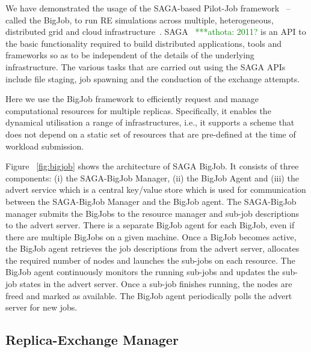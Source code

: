 \documentclass{rspublic}
\newcommand{\jhanote}[1]{ {\textcolor{red} { ***shantenu: #1 }}}
\newcommand{\athotanote}[1]{ {\textcolor{green} { ***athota: #1 }}}
\newcommand{\athotanote}[1]{}
\newcommand{\jhanote}[1]{}
\begin{document}
We have demonstrated the usage of the SAGA-based Pilot-Job
framework~\citep{saga_bigjob_condor_cloud} -- called the BigJob, to
run RE simulations across multiple, heterogeneous, distributed grid
and cloud infrastructure~\citep{Luckow:2008fp}.  SAGA~\citep{saga-url} \athotanote{2011?}
is an API to the basic functionality required to build distributed
applications, tools and frameworks so as to be independent of the
details of the underlying infrastructure.  The various tasks that are
carried out using the SAGA APIs include file staging, job spawning and
the conduction of the exchange attempts.

Here we use the BigJob framework to efficiently request and manage
computational resources for multiple replicas.  Specifically, it
enables the dynamical utilisation a range of infrastructures, i.e., it
supports a scheme that does not depend on a static set of resources
that are pre-defined at the time of workload submission.

Figure ~\ref{fig:bigjob} shows the architecture of SAGA BigJob.  It
consists of three components: (i) the SAGA-BigJob Manager, (ii) the
BigJob Agent and (iii) the advert service which is a central key/value
store which is used for communication between the SAGA-BigJob Manager
and the BigJob agent.  The SAGA-BigJob manager submits the BigJobs to
the resource manager and sub-job descriptions to the advert server.
There is a separate BigJob agent for each BigJob, even if there are
multiple BigJobs on a given machine.  Once a BigJob becomes active,
the BigJob agent retrieves the job descriptions from the advert
server, allocates the required number of nodes and launches the
sub-jobs on each resource. The BigJob agent continuously monitors the
running sub-jobs and updates the sub-job states in the advert
server. Once a sub-job finishes running, the nodes are freed and
marked as available. The BigJob agent periodically polls the advert
server for new jobs.

\subsection{Replica-Exchange Manager}\label{repexmanager} 

  
\end{document}
